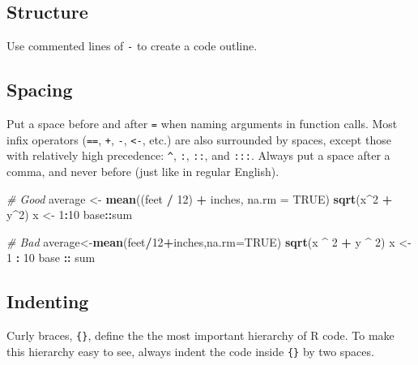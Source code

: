 \documentclass[]{book}
\newenvironment{Shaded}{\begin{snugshade}}{\end{snugshade}}
\newcommand{\KeywordTok}[1]{\textcolor[rgb]{0.13,0.29,0.53}{\textbf{#1}}}
\newcommand{\DataTypeTok}[1]{\textcolor[rgb]{0.13,0.29,0.53}{#1}}
\newcommand{\DecValTok}[1]{\textcolor[rgb]{0.00,0.00,0.81}{#1}}
\newcommand{\StringTok}[1]{\textcolor[rgb]{0.31,0.60,0.02}{#1}}
\newcommand{\CommentTok}[1]{\textcolor[rgb]{0.56,0.35,0.01}{\textit{#1}}}
\newcommand{\OtherTok}[1]{\textcolor[rgb]{0.56,0.35,0.01}{#1}}
\newcommand{\OperatorTok}[1]{\textcolor[rgb]{0.81,0.36,0.00}{\textbf{#1}}}
\newcommand{\NormalTok}[1]{#1}
\theoremstyle{definition}
\theoremstyle{definition}
\theoremstyle{definition}
\theoremstyle{remark}
\begin{document}
\subsection{Structure}\label{structure-1}

Use commented lines of \texttt{-} to create a code outline.

\subsection{Spacing}\label{spacing}

Put a space before and after \texttt{=} when naming arguments in
function calls. Most infix operators (\texttt{==}, \texttt{+},
\texttt{-}, \texttt{\textless{}-}, etc.) are also surrounded by spaces,
except those with relatively high precedence: \texttt{\^{}}, \texttt{:},
\texttt{::}, and \texttt{:::}. Always put a space after a comma, and
never before (just like in regular English).

\begin{Shaded}
\begin{Highlighting}[]
\CommentTok{# Good}
\NormalTok{average <-}\StringTok{ }\KeywordTok{mean}\NormalTok{((feet }\OperatorTok{/}\StringTok{ }\DecValTok{12}\NormalTok{) }\OperatorTok{+}\StringTok{ }\NormalTok{inches, }\DataTypeTok{na.rm =} \OtherTok{TRUE}\NormalTok{)}
\KeywordTok{sqrt}\NormalTok{(x}\OperatorTok{^}\DecValTok{2} \OperatorTok{+}\StringTok{ }\NormalTok{y}\OperatorTok{^}\DecValTok{2}\NormalTok{)}
\NormalTok{x <-}\StringTok{ }\DecValTok{1}\OperatorTok{:}\DecValTok{10}
\NormalTok{base}\OperatorTok{::}\NormalTok{sum}

\CommentTok{# Bad}
\NormalTok{average<-}\KeywordTok{mean}\NormalTok{(feet}\OperatorTok{/}\DecValTok{12}\OperatorTok{+}\NormalTok{inches,}\DataTypeTok{na.rm=}\OtherTok{TRUE}\NormalTok{)}
\KeywordTok{sqrt}\NormalTok{(x }\OperatorTok{^}\StringTok{ }\DecValTok{2} \OperatorTok{+}\StringTok{ }\NormalTok{y }\OperatorTok{^}\StringTok{ }\DecValTok{2}\NormalTok{)}
\NormalTok{x <-}\StringTok{ }\DecValTok{1} \OperatorTok{:}\StringTok{ }\DecValTok{10}
\NormalTok{base }\OperatorTok{::}\StringTok{ }\NormalTok{sum}
\end{Highlighting}
\end{Shaded}

\subsection{Indenting}\label{indenting}

Curly braces, \texttt{\{\}}, define the the most important hierarchy of
R code. To make this hierarchy easy to see, always indent the code
inside \texttt{\{\}} by two spaces.
\end{document}
